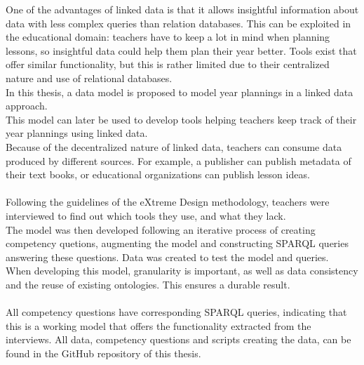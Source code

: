 \noindent One of the advantages of linked data is that it allows insightful information about data with less complex queries than relation databases.
This can be exploited in the educational domain: teachers have to keep a lot in mind when planning lessons, so insightful data could help them plan their year better.
Tools exist that offer similar functionality, but this is rather limited due to their centralized nature and use of relational databases.\\
In this thesis, a data model is proposed to model year plannings in a linked data approach.\\
This model can later be used to develop tools helping teachers keep track of their year plannings using linked data.\\
Because of the decentralized nature of linked data, teachers can consume data produced by different sources.
For example, a publisher can publish metadata of their text books, or educational organizations can publish lesson ideas.\\ \\
Following the guidelines of the eXtreme Design methodology, teachers were interviewed to find out which tools they use, and what they lack.\\
The model was then developed following an iterative process of creating competency quetions, augmenting the model and constructing SPARQL queries answering these questions.
Data was created to test the model and queries.\\ 
When developing this model, granularity is important, as well as data consistency and the reuse of existing ontologies. This ensures a durable result.\\ \\
All competency questions have corresponding SPARQL queries, indicating that this is a working model that offers the functionality extracted from the interviews.
All data, competency questions and scripts creating the data, can be found in the GitHub repository of this thesis.
